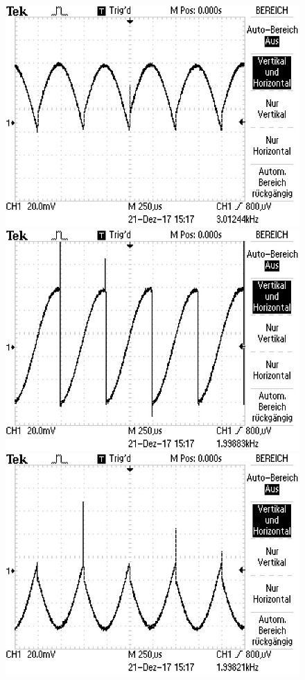 \begin{figure}
\begin{minipage}{0.48\textwidth}
\includegraphics[scale=0.6]{content/images/90.jpg}
\end{minipage}
\begin{minipage}{0.48\textwidth}
\includegraphics[scale=0.6]{content/images/180.jpg}
\end{minipage}
\includegraphics[scale=0.6]{content/images/270.jpg}

\end{figure}

